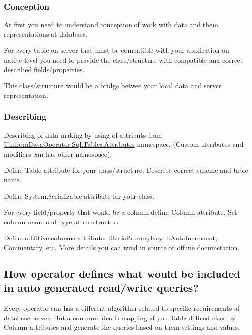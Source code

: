 \subsubsection*{Conception}

At first you need to understand conception of work with data and them representations at database.

For every table on server that must be compatible with your application on native level you need to provide the class/structure with compatible and correct described fields/properties.

This class/structure would be a bridge betwee your local data and server representation.

\subsubsection*{Describing}

Describing of data making by using of attributs from {\ttfamily \mbox{\hyperlink{namespace_uniform_data_operator_1_1_sql_1_1_tables_1_1_attributes}{Uniform\+Data\+Operator.\+Sql.\+Tables.\+Attributes}}} namespace. (Custom attributes and modifiers can has other namespace).


\begin{DoxyEnumerate}
\item Define {\ttfamily Table} attribute for your class/structure. Describe correct scheme and table name.
\item Define {\ttfamily System.\+Serializable} attribute for your class.
\item For every field/property that would be a column defind {\ttfamily Column} attribute. Set column name and type at constructor.
\item Define additive columns\textquotesingle{} attributes like {\ttfamily is\+Primary\+Key}, {\ttfamily is\+Auto\+Increment}, {\ttfamily Commentary}, etc. More details you can wind in source or offline documetation.
\end{DoxyEnumerate}

\subsection*{How operator defines what would be included in auto generated read/write queries?}

Every operator can has a different algorithm related to specific requirements of database server. But a common idea is mapping of you \textquotesingle{}Table\textquotesingle{} defined class by {\ttfamily Column} attributes and generate the queries based on them settings and values.

